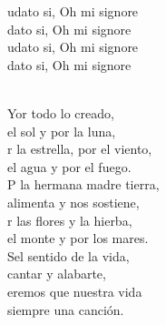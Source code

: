 \documentclass[12pt]{article}
\begin{document}
\begin{multicols*}{2}
\begin{cancion}[Laudato][]%
	\begin{chorus}%
	udato si, Oh mi signore\\
	dato si, Oh mi signore\\
	udato si, Oh mi signore\\
	dato si, Oh mi signore\\
	\end{chorus}%
	\jump\\
	Yor todo lo creado,\\
	 el sol y por la luna,\\
	r la estrella, por el viento,\\
	 el agua y por el fuego.\\
	P la hermana madre tierra,\\
	 alimenta y nos sostiene,\\
	r las flores y la hierba,\\
	 el monte y por los mares.\\
	Sel sentido de la vida,\\
	cantar y alabarte,\\
	eremos que nuestra vida\\
	 siempre una canción.\\
\end{cancion}%


\end{multicols*}
\end{document}
